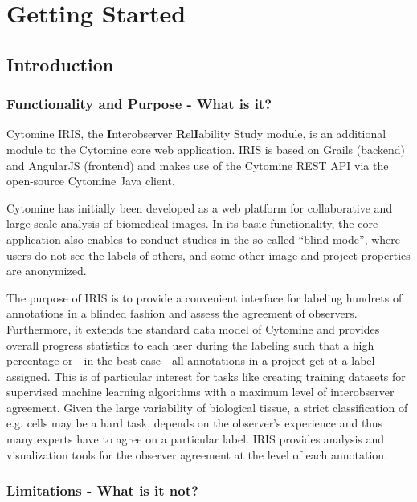 \part{Getting Started}
\label{part:gettingstarted}
{
\hypersetup{linkcolor=black}
\parttoc
}

\chapter{Introduction}
\label{chapter:introduction}
\section{Functionality and Purpose - What is it?}
Cytomine IRIS, the \textbf{I}nterobserver \textbf{R}el\textbf{I}ability Study module, is an additional module to the Cytomine core web application. 
IRIS is based on Grails (backend) and AngularJS (frontend) and makes use of the Cytomine REST API via the open-source Cytomine Java client. 

Cytomine has initially been developed as a web platform for collaborative and large-scale analysis of biomedical images. 
In its basic functionality, the core application also enables to conduct studies in the so called ``blind mode'', where users do not see the labels of others, and some other image and project properties are anonymized. 

The purpose of IRIS is to provide a convenient interface for labeling hundrets of annotations in a blinded fashion and assess the agreement of observers. 
Furthermore, it extends the standard data model of Cytomine and provides overall progress statistics to each user during the labeling such that a high percentage or - in the best case - all annotations in a project get at a label assigned. 
This is of particular interest for tasks like creating training datasets for supervised machine learning algorithms with a maximum level of interobserver agreement. 
Given the large variability of biological tissue, a strict classification of e.g. cells may be a hard task, depends on the observer's experience and thus many experts have to agree on a particular label. 
IRIS provides analysis and visualization tools for the observer agreement at the level of each annotation. 

\section{Limitations - What is it not?}


